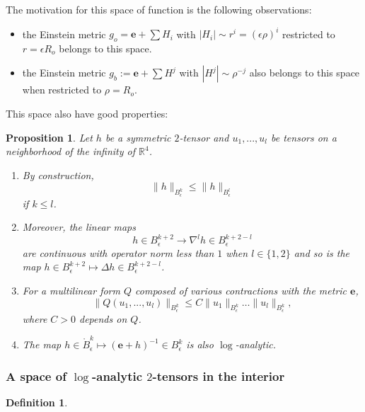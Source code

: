 \documentclass[12pt]{article}
\newtheorem{prop}[thm]{Proposition}
\newtheorem{defn}[thm]{Definition}
\begin{document}
    The motivation for this space of function is the following observations:
    \begin{itemize}
        \item the Einstein metric $g_o = \mathbf{e} + \sum H_i$ with $|H_i|\sim r^i=(\epsilon\rho)^i$ restricted to $r=\epsilon R_o$ belongs to this space.
        \item the Einstein metric $g_b := \mathbf{e} + \sum H^j$ with $|H^{j}|\sim \rho^{-j}$ also belongs to this space when restricted to $\rho=R_o$.
    \end{itemize}
    
    This space also have good properties:
    \begin{prop}\label{properties B epsilon k}
    Let $h$ be a symmetric $2$-tensor and $u_1,...,u_l$ be tensors on a neighborhood of the infinity of $\mathbb{R}^4$. 
    \begin{enumerate}
        \item By construction,
    $$\|h\|_{B_\epsilon^k}\leqslant \|h\|_{B_\epsilon^l}$$
    if $k\leqslant l$. 
    \item Moreover, the linear maps
    $$ h\in B^{k+2}_\epsilon\to \nabla^lh\in B^{k+2-l}_\epsilon $$
    are continuous with operator norm less than $1$ when $l\in \{1,2\}$ and so is the map $ h\in B^{k+2}_\epsilon\mapsto \Delta h \in B^{k+2-l}_\epsilon$. 
    \item For a multilinear form $Q$ composed of various contractions with the metric $\mathbf{e}$,
    $$ \|Q(u_1,...,u_l)\|_{B^{k}_\epsilon} \leqslant C\|u_1\|_{B^{k}_\epsilon}\ldots \|u_l\|_{B^{k}_\epsilon},$$ where $C>0$ depends on $Q$.
    \item The map $h\in \mathring{B}_\epsilon^k\mapsto(\mathbf{e}+h)^{-1}\in B_\epsilon^k$ is also $\log$-analytic. 
    \end{enumerate}
    \end{prop}
    
    \subsubsection{A space of $\log$-analytic $2$-tensors in the interior}
    
    \begin{defn}
    
     
    \end{defn}
    
\end{document}
